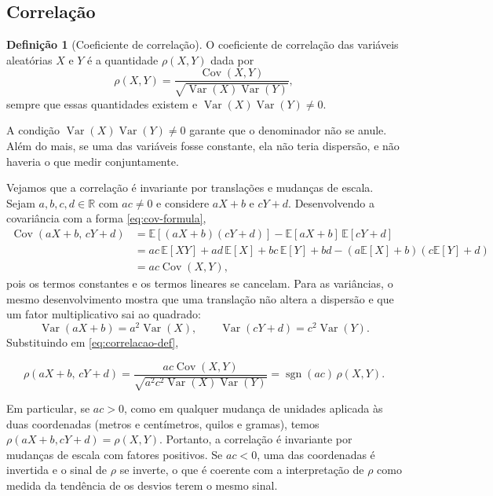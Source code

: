 \documentclass[12pt,portuguese]{article}
\theoremstyle{definition}
\newtheorem{definition}[definition]{Definição}
\theoremstyle{plainexercise}
\theoremstyle{starredexercise}
\theoremstyle{definition}
\begin{document}
\subsection{Correlação}\label{subsec:correlacao}

\begin{definition}[Coeficiente de correlação]\label{def:correlacao}
O coeficiente de correlação das variáveis aleatórias $X$ e $Y$ é a quantidade
$\rho(X,Y)$ dada por
\begin{equation}\label{eq:correlacao-def}
\rho(X,Y)=\frac{\operatorname{Cov}(X,Y)}
{\sqrt{\operatorname{Var}(X)\operatorname{Var}(Y)}},
\end{equation}
sempre que essas quantidades existem e
$\operatorname{Var}(X)\operatorname{Var}(Y)\neq 0$.
\end{definition}

A condição $\operatorname{Var}(X)\operatorname{Var}(Y)\neq 0$ garante que o
denominador não se anule. Além do mais, se uma das variáveis fosse constante, ela não teria
dispersão, e não haveria o que medir conjuntamente.

Vejamos que a correlação é invariante por translações e mudanças de escala.
Sejam $a,b,c,d\in\mathbb{R}$ com $ac\neq 0$ e considere $aX+b$ e $cY+d$.
Desenvolvendo a covariância com a forma \eqref{eq:cov-formula},
\begin{align*}
\operatorname{Cov}(aX+b,\,cY+d)
&= \mathbb{E}[(aX+b)(cY+d)]-\mathbb{E}[aX+b]\,\mathbb{E}[cY+d] \\[0.2cm]
&= ac\,\mathbb{E}[XY]+ad\,\mathbb{E}[X]+bc\,\mathbb{E}[Y]+bd
   -(a\mathbb{E}[X]+b)(c\mathbb{E}[Y]+d) \\[0.2cm]
&= ac\operatorname{Cov}(X,Y),
\end{align*}
pois os termos constantes e os termos lineares se cancelam. Para as variâncias,
o mesmo desenvolvimento mostra que uma translação não altera a dispersão e que
um fator multiplicativo sai ao quadrado:
\[
\operatorname{Var}(aX+b)=a^2\operatorname{Var}(X),
\qquad
\operatorname{Var}(cY+d)=c^2\operatorname{Var}(Y).
\]
Substituindo em \eqref{eq:correlacao-def},

\begin{equation}\label{eq:correlacao-invariancia}
\rho(aX+b,\,cY+d)
=\frac{ac\operatorname{Cov}(X,Y)}
{\sqrt{a^2c^2\operatorname{Var}(X)\operatorname{Var}(Y)}}
=\operatorname{sgn}(ac)\,\rho(X,Y).
\end{equation}

Em particular, se $ac>0$, como em qualquer mudança de unidades aplicada às duas
coordenadas (metros e centímetros, quilos e gramas), temos
$\rho(aX+b,cY+d)=\rho(X,Y)$. Portanto, a correlação é invariante por
mudanças de escala com fatores positivos.
Se $ac<0$, uma das coordenadas é invertida e o sinal de $\rho$ se inverte, o que é
coerente com a interpretação de $\rho$ como medida da tendência de os desvios
terem o mesmo sinal.
\end{document}
